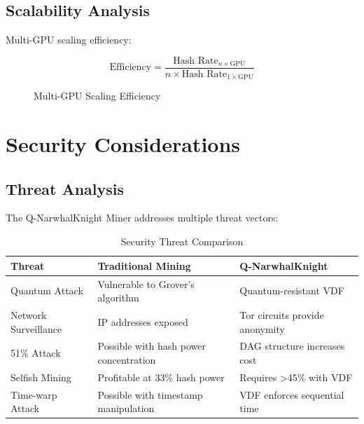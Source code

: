 \documentclass[11pt,a4paper]{article}
\begin{document}
\subsection{Scalability Analysis}

Multi-GPU scaling efficiency:

\begin{equation}
    \text{Efficiency} = \frac{\text{Hash Rate}_{n \times \text{GPU}}}{n \times \text{Hash Rate}_{1 \times \text{GPU}}}
\end{equation}

\begin{figure}[H]
\centering
{}
\caption{Multi-GPU Scaling Efficiency}
\end{figure}

\section{Security Considerations}

\subsection{Threat Analysis}

The Q-NarwhalKnight Miner addresses multiple threat vectors:

\begin{table}[H]
\centering
\begin{tabular}{|l|p{5cm}|p{5cm}|}
\hline
\textbf{Threat} & \textbf{Traditional Mining} & \textbf{Q-NarwhalKnight} \\
\hline
Quantum Attack & Vulnerable to Grover's algorithm & Quantum-resistant VDF \\
Network Surveillance & IP addresses exposed & Tor circuits provide anonymity \\
51\% Attack & Possible with hash power concentration & DAG structure increases cost \\
Selfish Mining & Profitable at 33\% hash power & Requires >45\% with VDF \\
Time-warp Attack & Possible with timestamp manipulation & VDF enforces sequential time \\
\hline
\end{tabular}
\caption{Security Threat Comparison}
\end{table}
\end{document}
